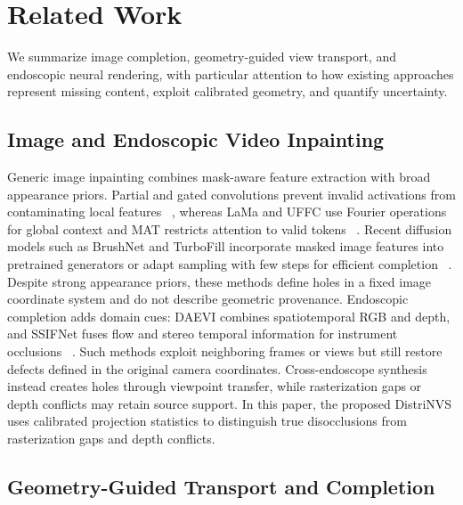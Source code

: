 \documentclass[letterpaper,10pt,conference]{ieeeconf}
\begin{document}
\section{Related Work}
\label{sec:related}

We summarize image completion, geometry-guided view transport, and
endoscopic neural rendering, with particular attention to how existing
approaches represent missing content, exploit calibrated geometry, and quantify
uncertainty.


\subsection{Image and Endoscopic Video Inpainting}

Generic image inpainting combines mask-aware feature extraction with
broad appearance priors. Partial and gated convolutions prevent
invalid activations from contaminating local features
~\cite{yu2019gated}, whereas LaMa and UFFC use Fourier operations
for global context and MAT restricts attention to valid tokens
~\cite{suvorov2022lama,chu2023uffc,li2022mat}. Recent diffusion models such as
BrushNet and TurboFill incorporate masked image features into pretrained
generators or adapt sampling with few steps for efficient completion
~\cite{ju2024brushnet,xie2025turbofill}. Despite strong appearance priors, these
methods define holes in a fixed image coordinate system and do not describe
geometric provenance. Endoscopic completion adds domain cues: DAEVI combines
spatiotemporal RGB and depth, and SSIFNet fuses flow and stereo temporal
information for instrument occlusions
~\cite{zhang2024daevi,zou2025ssifnet}. Such methods exploit
neighboring frames or views but still restore defects defined in the original
camera coordinates.
Cross-endoscope synthesis instead creates holes through viewpoint transfer, while rasterization gaps or depth conflicts may retain source support. In this paper, the proposed DistriNVS uses calibrated projection statistics to distinguish true disocclusions from rasterization gaps and depth conflicts.


\subsection{Geometry-Guided Transport and Completion}
\end{document}
